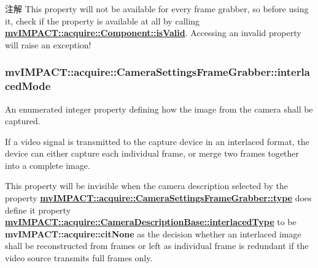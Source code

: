 \begin{DoxyNote}{注解}
This property will not be available for every frame grabber, so before using it, check if the property is available at all by calling {\bfseries \hyperlink{classmv_i_m_p_a_c_t_1_1acquire_1_1_component_ac51e55e7e046101f3c6119d84123abd5}{mv\+I\+M\+P\+A\+C\+T\+::acquire\+::\+Component\+::is\+Valid}}. Accessing an invalid property will raise an exception! 
\end{DoxyNote}
\hypertarget{classmv_i_m_p_a_c_t_1_1acquire_1_1_camera_settings_frame_grabber_a9ef986a0f1d1e13dec2f29c13bd4de5c}{
\subsubsection[{interlaced\+Mode}]{ mv\+I\+M\+P\+A\+C\+T\+::acquire\+::\+Camera\+Settings\+Frame\+Grabber\+::interlaced\+Mode}}\label{classmv_i_m_p_a_c_t_1_1acquire_1_1_camera_settings_frame_grabber_a9ef986a0f1d1e13dec2f29c13bd4de5c}


An enumerated integer property defining how the image from the camera shall be captured. 

If a video signal is transmitted to the capture device in an interlaced format, the device can either capture each individual frame, or merge two frames together into a complete image.

This property will be invisible when the camera description selected by the property {\bfseries \hyperlink{classmv_i_m_p_a_c_t_1_1acquire_1_1_camera_settings_frame_grabber_a3cf5c97b03127b143d79619658e2edb9}{mv\+I\+M\+P\+A\+C\+T\+::acquire\+::\+Camera\+Settings\+Frame\+Grabber\+::type}} does define it property {\bfseries \hyperlink{classmv_i_m_p_a_c_t_1_1acquire_1_1_camera_description_base_accd697662a91ec66a710677104ab1fe1}{mv\+I\+M\+P\+A\+C\+T\+::acquire\+::\+Camera\+Description\+Base\+::interlaced\+Type}} to be {\bfseries mv\+I\+M\+P\+A\+C\+T\+::acquire\+::cit\+None} as the decision whether an interlaced image shall be reconstructed from frames or left as individual frame is redundant if the video source transmits full frames only.

